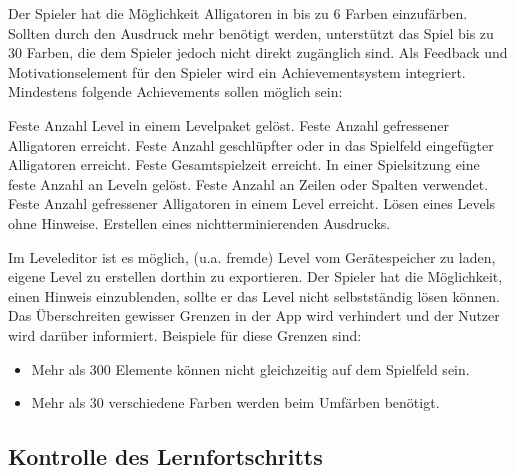 \begin{requirements}
	 Der Spieler hat die Möglichkeit Alligatoren in bis zu 6 Farben einzufärben.
	Sollten durch den Ausdruck mehr benötigt werden, unterstützt das Spiel bis zu 30 Farben, die dem Spieler jedoch nicht direkt zugänglich sind.
	Als Feedback und Motivationselement für den Spieler wird ein Achievementsystem integriert.
	Mindestens folgende Achievements sollen möglich sein:
		\begin{requirements}
			 Feste Anzahl Level in einem Levelpaket gelöst.
			 Feste Anzahl gefressener Alligatoren erreicht.
			 Feste Anzahl geschlüpfter oder in das Spielfeld eingefügter Alligatoren erreicht.
			 Feste Gesamtspielzeit erreicht.
			 In einer Spielsitzung eine feste Anzahl an Leveln gelöst.
			 Feste Anzahl an Zeilen oder Spalten verwendet.
			 Feste Anzahl gefressener Alligatoren in einem Level erreicht.
			 Lösen eines Levels ohne Hinweise.
			 Erstellen eines nichtterminierenden Ausdrucks.
		\end{requirements}
	Im Leveleditor ist es möglich, (u.a. fremde) Level vom Gerätespeicher zu laden, eigene Level zu erstellen dorthin zu exportieren.
	 Der Spieler hat die Möglichkeit, einen Hinweis einzublenden, sollte er das Level nicht selbstständig lösen können.
	 Das Überschreiten gewisser Grenzen in der App wird verhindert und der Nutzer wird darüber informiert.
	Beispiele für diese Grenzen sind:
	\begin{itemize}
		\item Mehr als 300 Elemente können nicht gleichzeitig auf dem Spielfeld sein.
		\item Mehr als 30 verschiedene Farben werden beim Umfärben benötigt.
	\end{itemize}
\end{requirements}


\subsection{Kontrolle des Lernfortschritts}

